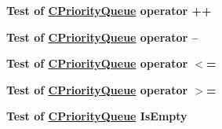 \begin{DoxyRefList}
\label{test__test000009}%
%
{\bfseries{Test of \mbox{\hyperlink{class_c_priority_queue}{C\+Priority\+Queue}} operator ++}} 

\label{test__test000010}%
%
{\bfseries{Test of \mbox{\hyperlink{class_c_priority_queue}{C\+Priority\+Queue}} operator --}} 

\label{test__test000011}%
%
{\bfseries{Test of \mbox{\hyperlink{class_c_priority_queue}{C\+Priority\+Queue}} operator $<$=}} 

\label{test__test000012}%
%
{\bfseries{Test of \mbox{\hyperlink{class_c_priority_queue}{C\+Priority\+Queue}} operator $>$=}} 

\label{test__test000013}%
%
{\bfseries{Test of \mbox{\hyperlink{class_c_priority_queue}{C\+Priority\+Queue}} Is\+Empty}} 
\end{DoxyRefList}